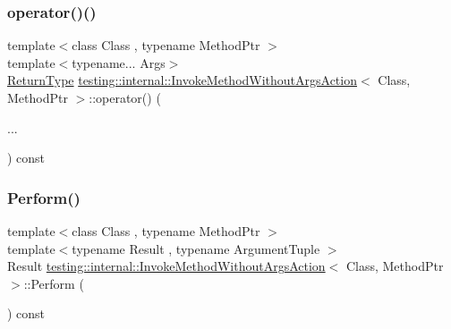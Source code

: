 \subsubsection{\texorpdfstring{operator()()}{operator()()}\hspace{0.1cm}{\footnotesize\ttfamily [2/2]}}
{\footnotesize\ttfamily template$<$class Class , typename Method\+Ptr $>$ \\
template$<$typename... Args$>$ \\
\mbox{\hyperlink{structtesting_1_1internal_1_1_invoke_method_without_args_action_ad1acb81830c5636daf7c6d44064b4e58}{Return\+Type}} \mbox{\hyperlink{structtesting_1_1internal_1_1_invoke_method_without_args_action}{testing\+::internal\+::\+Invoke\+Method\+Without\+Args\+Action}}$<$ Class, Method\+Ptr $>$\+::operator() (\begin{DoxyParamCaption}\item[{const \mbox{\hyperlink{namespacetesting_aaca153f67b689b8b9d5b8c67ecf8cee4}{Args}} \&}]{... }\end{DoxyParamCaption}) const\hspace{0.3cm}{\ttfamily [inline]}}

\mbox{\label{structtesting_1_1internal_1_1_invoke_method_without_args_action_a9915e4f7a064e00b7798216644670b52}} 
\subsubsection{\texorpdfstring{Perform()}{Perform()}}
{\footnotesize\ttfamily template$<$class Class , typename Method\+Ptr $>$ \\
template$<$typename Result , typename Argument\+Tuple $>$ \\
Result \mbox{\hyperlink{structtesting_1_1internal_1_1_invoke_method_without_args_action}{testing\+::internal\+::\+Invoke\+Method\+Without\+Args\+Action}}$<$ Class, Method\+Ptr $>$\+::Perform (\begin{DoxyParamCaption}\item[{const Argument\+Tuple \&}]{ }\end{DoxyParamCaption}) const\hspace{0.3cm}{\ttfamily [inline]}}



